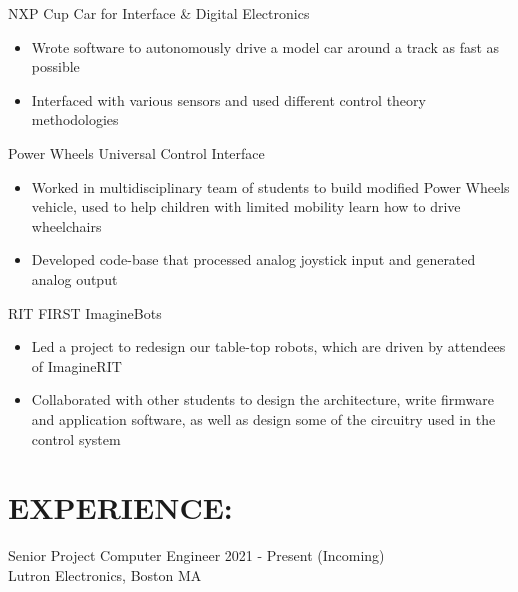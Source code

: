 \documentclass[line,margin]{res}
\newcommand{\SECTIONOFFSET}{-5pt}
\newcommand{\ITEMOFFSET}{-8pt}
\begin{document}
\begin{resume}

		NXP Cup Car for Interface \& Digital Electronics
		\begin{itemize}
			\item Wrote software to autonomously drive a model car around a track as fast as possible
			\item Interfaced with various sensors and used different control theory methodologies
		\end{itemize}
		\vspace{\ITEMOFFSET}

		Power Wheels Universal Control Interface
		\begin{itemize}
			\item Worked in multidisciplinary team of students to build modified Power Wheels vehicle, used to help children with limited mobility learn how to drive wheelchairs
			\item Developed code-base that processed analog joystick input and generated analog output
		\end{itemize}
		\vspace{\ITEMOFFSET}

		RIT FIRST ImagineBots
		\begin{itemize}
			\item Led a project to redesign our table-top robots, which are driven by attendees of ImagineRIT 
			\item Collaborated with other students to design the architecture, write firmware and application software, as well as design some of the circuitry used in the control system
		\end{itemize}

		\vspace{\SECTIONOFFSET}

	\section{EXPERIENCE:}

		Senior Project Computer Engineer \hfill 2021 - Present (Incoming)\\
		Lutron Electronics, Boston MA
		\vspace{\ITEMOFFSET}


\end{resume}
\end{document}
